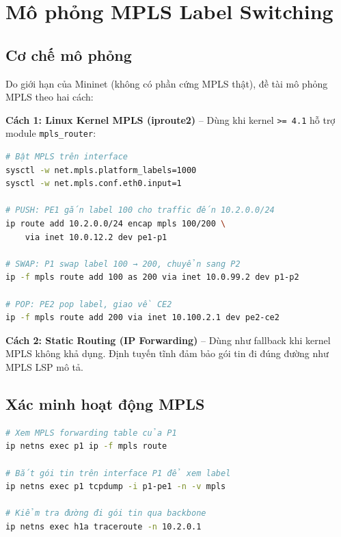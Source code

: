 \section{Mô phỏng MPLS Label Switching}

\subsection{Cơ chế mô phỏng}

Do giới hạn của Mininet (không có phần cứng MPLS thật), đề tài mô phỏng MPLS theo hai cách:

\textbf{Cách 1: Linux Kernel MPLS (iproute2)} – Dùng khi kernel \texttt{\textgreater{}= 4.1} hỗ trợ module \texttt{mpls\_router}:

\begin{lstlisting}[language=bash, frame=single, basicstyle=\ttfamily\small]
# Bật MPLS trên interface
sysctl -w net.mpls.platform_labels=1000
sysctl -w net.mpls.conf.eth0.input=1

# PUSH: PE1 gắn label 100 cho traffic đến 10.2.0.0/24
ip route add 10.2.0.0/24 encap mpls 100/200 \
    via inet 10.0.12.2 dev pe1-p1

# SWAP: P1 swap label 100 → 200, chuyển sang P2
ip -f mpls route add 100 as 200 via inet 10.0.99.2 dev p1-p2

# POP: PE2 pop label, giao về CE2
ip -f mpls route add 200 via inet 10.100.2.1 dev pe2-ce2
\end{lstlisting}

\textbf{Cách 2: Static Routing (IP Forwarding)} – Dùng như fallback khi kernel MPLS không khả dụng. Định tuyến tĩnh đảm bảo gói tin đi đúng đường như MPLS LSP mô tả.

\subsection{Xác minh hoạt động MPLS}

\begin{lstlisting}[language=bash, frame=single, basicstyle=\ttfamily\small]
# Xem MPLS forwarding table của P1
ip netns exec p1 ip -f mpls route

# Bắt gói tin trên interface P1 để xem label
ip netns exec p1 tcpdump -i p1-pe1 -n -v mpls

# Kiểm tra đường đi gói tin qua backbone
ip netns exec h1a traceroute -n 10.2.0.1
\end{lstlisting}
